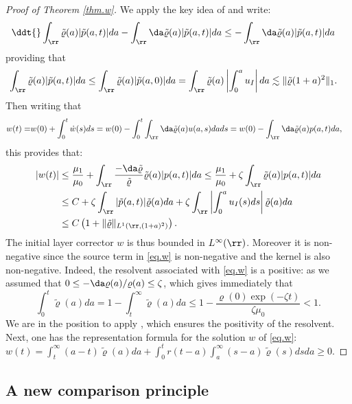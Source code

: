 \documentclass[]{jnsao}
\newcommand{\kernel}{\varrho}
\newcommand{\tkernel}{\tilde{\varrho}}
\newcommand{\tp}{\tilde{p}}
\begin{document}
\begin{proof}[Proof of Theorem \ref{thm.w}]
 	We apply the key idea of \cite[Lemma 5.1]{MiOel.2} and write:
 	\begin{align}
 	\ddt{} \int_\rr \tkernel (a) |\tp(a,t)| da &- \int_\rr \da \tkernel (a) |\tp(a,t) | da \leq - \int_\rr \da \tkernel (a) |\tp(a,t) | da
 	\end{align}
 	providing that 
	\begin{align}
	\int_\rr \tkernel(a) | \tp(a,t) | da &\leq \int_\rr \tkernel(a) | \tp(a,0) | da 
	= \int_\rr \tkernel(a) \left| \int_0^a u_I\right| da \lesssim \| \tkernel (1+a)^2\|_{1}.
	\end{align}
 	Then writing that 
 	$$
 	\begin{aligned}
 		w(t) = & w(0) + \int_0^t \dot{w}(s)ds = w(0) - \int_0^t \int_\rr \da \tkernel(a) u(a,s) da ds  
		= w(0) -  \int_\rr \da \tkernel(a) p(a,t) da, 
 	\end{aligned}
 	$$
 	this provides that:
 	\begin{align}
 			\left|w(t)\right| &\leq \frac{\mu_1}{\mu_0} + \int_\rr \frac{-\da \tkernel}{\tkernel} \tkernel(a) | p(a,t) | da\leq \frac{\mu_1}{\mu_0} + \zeta \int_\rr   \tkernel(a) | p(a,t) | da \\
 			&\leq C + \zeta \int_\rr | \tp(a,t) | \tkernel(a) da +  \zeta \int_\rr \left| \int_0^a u_I(s)ds \right| \tkernel(a) da \\
			&\leq C \left(1 + \| \tkernel \|_{L^1(\rr,(1+a)^2)}\right).
 	\end{align}
The initial layer corrector $w$ is thus bounded in $L^\infty(\rr)$. Moreover it is non-negative since the source term in \eqref{eq.w} is non-negative and the kernel is also non-negative.
Indeed, the resolvent associated with \eqref{eq.w} is a positive: 
as we assumed that $0\leq -\da \kernel(a) / \kernel(a) \leq \zeta$, 
 	which gives immediately that 
 	$$
 	\int_0^t \tkernel (a) da = 1 - \int_t^\infty \tkernel(a) da \leq 1 - \frac{\kernel(0)\exp(-\zeta t)}{\zeta \mu_0} < 1.
 	$$
 	We are in the position to  apply \cite[Proposition 9.8.1]{grip}, which ensures the positivity of the resolvent. Next, one has the 
	representation formula for the solution $w$ of \eqref{eq.w}: $w(t)= \int_t^\infty(a-t)\tkernel(a) da + \int_0^t r(t-a) \int_a^\infty (s-a)\tkernel(s) ds da\geq 0$.
	\end{proof}
 
 \subsection{A new comparison principle}\label{sec:comparison} 
\end{document}
